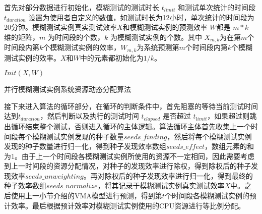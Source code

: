 \documentclass[master]{thesis-uestc}
\begin{document}
首先对部分数据进行初始化，模糊测试的测试时长 $t_{limit}$ 和测试单次统计的时间段$t_{duration}$ 设置为使用者自定义的数值，如测试时长为12小时，单次统计的时间段为20分钟。模糊测试实例真实测试效率$X$和模糊测试实例的预测效率 $W$都是 $m * k$ 维的矩阵，$m$ 为时间段的个数，$k$ 为模糊测试实例的个数。其中 $X_{m,k}$为在第$m$个时间段内第$k$个模糊测试实例的效率，$W_{m,k}$为系统预测第$m$个时间段内第$k$个模糊测试实例的效率。$X$和$W$中的元素都初始化为$1/k$。
\vspace{-20pt}
\begin{algorithm}[!t]
    $Init(X, W)$\;
    \caption{并行模糊测试实例系统资源动态分配算法}
    \label{ins_power}
\end{algorithm}

接下来进入算法的循环部分，在循环的判断条件中，首先阻塞的等待当前测试时间达到$t_{duration}$，然后判断以及执行的测试时间 $t_{elapsed}$ 是否超过 $t_{limit}$，如果超过则跳出循环结束整个测试，否则进入循环的主体逻辑。算法循环主体首先收集上一个时间段每个模糊测试实例发现的种子数量$seeds\_finding$，然后将每个模糊测试实例发现的种子数量进行归一化，得到种子发现效率数组$seeds\_effect$，数组元素的和为1。由于上一个时间段各模糊测试实例所使用的资源不一定相同，因此需要考虑到上一时间段的资源分配情况，对种子的发现效率进行除权，得到除权后的种子发现效率$seeds\_unweighting$。再对除权后的种子发现效率进行归一化，得到最终的种子效率数组$seeds\_normalize$，将其记录于模糊测试实例真实测试效率$X$中。之后使用上一小节介绍的VMA模型进行预测，得到第$t$个时间段各模糊测试实例的预计效率。最后根据预计效率对模糊测试实例使用的CPU资源进行等比例分配。
\end{document}
